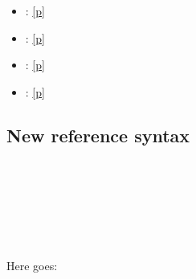 {\begin{itemize}\item{ : \hyperref[container-page-test-module-Ocamlary-indexmodules]{[p\pageref*{container-page-test-module-Ocamlary-indexmodules}]}}%
\item{ : \hyperref[container-page-test-module-Ocamlary-aliases]{[p\pageref*{container-page-test-module-Ocamlary-aliases}]}}%
\item{ : \hyperref[xref-unresolved]{[p\pageref*{xref-unresolved}]}}%
\item{ : \hyperref[container-page-test-module-Ocamlary-module-Aliases-incl]{[p\pageref*{container-page-test-module-Ocamlary-module-Aliases-incl}]}}\end{itemize}%
\subsection{New reference syntax\label{new-reference-syntax}}%
\label{container-page-test-module-Ocamlary-module-type-M}\begin{ocamlindent}\label{container-page-test-module-Ocamlary-module-type-M-type-t}\\
\end{ocamlindent}%
\\
\label{container-page-test-module-Ocamlary-module-M}\begin{ocamlindent}\label{container-page-test-module-Ocamlary-module-M-type-t}\\
\end{ocamlindent}%
\\
Here goes:

}
